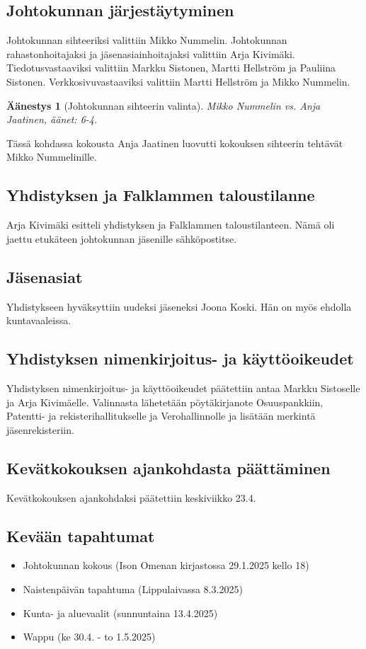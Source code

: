 \documentclass[a4paper,12pt]{article}
\newtheorem{aanestys}{Äänestys}
\begin{document}
\subsection{Johtokunnan järjestäytyminen}
Johtokunnan sihteeriksi valittiin Mikko Nummelin. Johtokunnan rahastonhoitajaksi ja jäsenasiainhoitajaksi valittiin Arja Kivimäki. Tiedotusvastaaviksi valittiin Markku Sistonen, Martti Hellström ja Pauliina Sistonen. Verkkosivuvastaaviksi valittiin Martti Hellström ja Mikko Nummelin.
\begin{aanestys}[Johtokunnan sihteerin valinta]
  Mikko Nummelin vs. Anja Jaatinen, äänet: 6-4.
\end{aanestys}
Tässä kohdassa kokousta Anja Jaatinen luovutti kokouksen sihteerin tehtävät Mikko Nummelinille.
\subsection{Yhdistyksen ja Falklammen taloustilanne}
Arja Kivimäki esitteli yhdistyksen ja Falklammen taloustilanteen. Nämä oli jaettu etukäteen johtokunnan jäsenille sähköpostitse.
\subsection{Jäsenasiat}
Yhdistykseen hyväksyttiin uudeksi jäseneksi Joona Koski. Hän on myös ehdolla kuntavaaleissa.
\subsection{Yhdistyksen nimenkirjoitus- ja käyttöoikeudet}
Yhdistyksen nimenkirjoitus- ja käyttöoikeudet päätettiin antaa Markku Sistoselle ja Arja Kivimäelle. Valinnasta lähetetään pöytäkirjanote Osuuspankkiin, Patentti- ja rekisterihallitukselle ja Verohallinnolle ja lisätään merkintä jäsenrekisteriin.
\subsection{Kevätkokouksen ajankohdasta päättäminen}
Kevätkokouksen ajankohdaksi päätettiin keskiviikko 23.4.
\subsection{Kevään tapahtumat}
\begin{itemize}
\item{Johtokunnan kokous} (Ison Omenan kirjastossa 29.1.2025 kello 18)
\item{Naistenpäivän tapahtuma} (Lippulaivassa 8.3.2025)
\item{Kunta- ja aluevaalit} (sunnuntaina 13.4.2025)
\item{Wappu} (ke 30.4. - to 1.5.2025)
\end{itemize}
\end{document}
